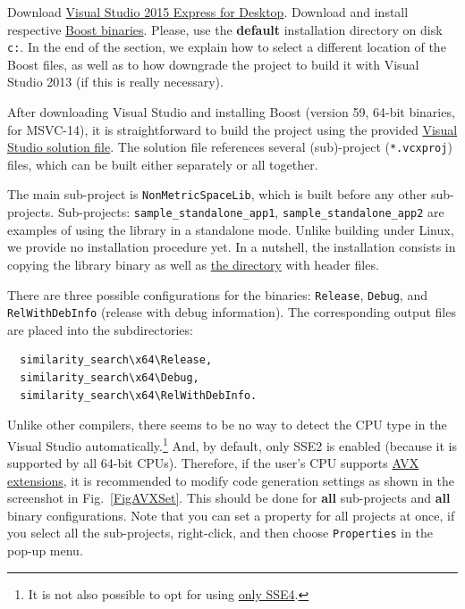 \documentclass[runningheads,a4paper]{llncs}
\newcommand{\replocdir}{https://github.com/searchivarius/nmslib/tree/v1.5/}
\newcommand{\replocfile}{https://github.com/searchivarius/nmslib/blob/v1.5/}
\newcommand{\ttt}[1]{\texttt{#1}}
\begin{document}
{Download \href{https://www.visualstudio.com/en-us/downloads/download-visual-studio-vs.aspx}{Visual Studio 2015 Express for Desktop}. 
Download and install respective \href{http://sourceforge.net/projects/boost/files/boost-binaries/1.59.0/boost_1_59_0-msvc-14.0-64.exe/download}{Boost binaries}. Please, use the \textbf{default} installation directory on disk \ttt{c:}.
In the end of the section, we explain how to select a different location of the Boost files,
as well as to how downgrade the project to build it with Visual Studio 2013 (if this is really necessary). 

After downloading Visual Studio and installing Boost (version 59, 64-bit binaries, for MSVC-14), it is straightforward to build the project
using the provided \href{\replocfile similarity_search/NonMetricSpaceLib.sln}{Visual Studio 
solution file}.
The solution file references several (sub)-project (\ttt{*.vcxproj}) files,
which can be built either separately or all together.

The main sub-project is \ttt{NonMetricSpaceLib}, which is built before any other sub-projects. 
Sub-projects: 
\ttt{sample\_standalone\_app1},
\ttt{sample\_standalone\_app2} 
are examples of using the library in a standalone mode.
Unlike building under Linux, we provide no installation procedure yet.
In a nutshell, the installation consists in copying the library binary
as well as \href{\replocdir similarity_search/include}{the directory} with header files.

There are three possible configurations for the binaries: 
\ttt{Release}, \ttt{Debug}, and \ttt{RelWithDebInfo} (release with debug information). 
The corresponding output files are placed into the subdirectories:
\begin{verbatim}
  similarity_search\x64\Release,
  similarity_search\x64\Debug,
  similarity_search\x64\RelWithDebInfo.
\end{verbatim}

Unlike other compilers, there seems to be no way to detect the CPU type in the Visual Studio automatically.\footnote{It is not also possible to opt for using \href{http://en.wikipedia.org/wiki/SSE4}{only SSE4}.}
And, by default, only SSE2 is enabled (because it is supported by all 64-bit CPUs).
Therefore, if the user's CPU supports \href{https://en.wikipedia.org/wiki/Advanced_Vector_Extensions}{AVX extensions}, it is recommended to modify code generation settings as shown in the screenshot in Fig.~\ref{FigAVXSet}.
This should be done for \textbf{all} sub-projects and \textbf{all} binary configurations.
Note that you can set a property for all projects at once, if you select all the sub-projects, right-click, and then choose \ttt{Properties} 
in the pop-up menu.

}
\end{document}
